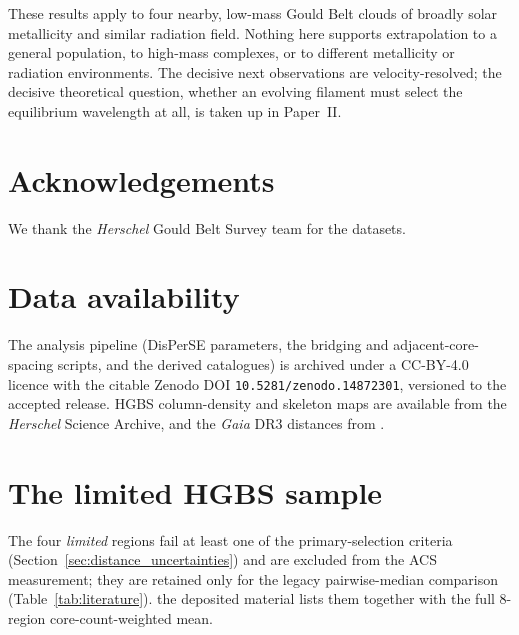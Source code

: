 \documentclass[usenatbib,twoside,twocolumn]{mnras}
\begin{document}
These results apply to four nearby, low-mass Gould Belt clouds of broadly solar metallicity and similar radiation field. Nothing here supports extrapolation to a general population, to high-mass complexes, or to different metallicity or radiation environments. The decisive next observations are velocity-resolved; the decisive theoretical question, whether an evolving filament must select the equilibrium wavelength at all, is taken up in Paper~II.

\section*{Acknowledgements}

We thank the \textit{Herschel} Gould Belt Survey team for the datasets.

\section*{Data availability}

The analysis pipeline (DisPerSE parameters, the bridging and adjacent-core-spacing scripts, and the derived catalogues) is archived under a CC-BY-4.0 licence with the citable Zenodo DOI \texttt{10.5281/zenodo.14872301}, versioned to the accepted release. HGBS column-density and skeleton maps are available from the \textit{Herschel} Science Archive, and the \textit{Gaia} DR3 distances from \citet{Zhang2023}.



\appendix

\section{The limited HGBS sample}
\label{sec:limited_sample}
The four \emph{limited} regions fail at least one of the primary-selection criteria (Section~\ref{sec:distance_uncertainties}) and are excluded from the ACS measurement; they are retained only for the legacy pairwise-median comparison (Table~\ref{tab:literature}). the deposited material lists them together with the full 8-region core-count-weighted mean.
\end{document}
